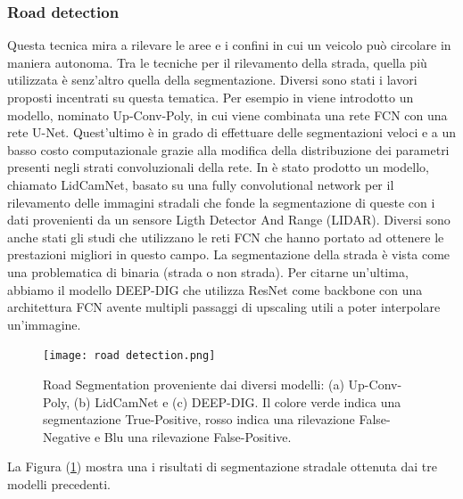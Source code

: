 \subsubsection{Road detection}
Questa tecnica mira a rilevare le aree e i confini in cui un veicolo può circolare 
in maniera autonoma. Tra le tecniche per il rilevamento 
della strada, quella più utilizzata è senz'altro quella della segmentazione. Diversi sono stati i 
lavori proposti incentrati su questa tematica. Per esempio in \cite{Up-conv-Poly} viene 
introdotto un modello, nominato Up-Conv-Poly, in cui viene combinata una 
rete FCN con una rete U-Net. Quest'ultimo è in grado di effettuare delle 
segmentazioni veloci e a un basso costo computazionale grazie alla modifica 
della distribuzione dei parametri presenti negli strati convoluzionali della 
rete. In \cite{CALTAGIRONE2019125} è stato prodotto un modello, chiamato LidCamNet, basato su 
una fully convolutional network per il rilevamento delle immagini stradali 
che fonde la segmentazione di queste con i dati provenienti da un sensore 
Ligth Detector And Range (LIDAR). Diversi sono anche stati gli studi che 
utilizzano le reti FCN che hanno portato ad ottenere le prestazioni migliori 
in questo campo. La segmentazione della strada è vista come una problematica di 
 binaria (strada o non strada). Per citarne un'ultima, abbiamo 
il modello DEEP-DIG \cite{DEEP-DIG} che utilizza ResNet come backbone con una 
architettura FCN avente multipli passaggi di upscaling utili a poter interpolare 
un'immagine. 
\begin{figure}
    \centering
    \texttt{[image: road detection.png]}
    \centering
    \caption{Road Segmentation proveniente dai diversi modelli: (a) Up-Conv-Poly, (b) LidCamNet e (c) DEEP-DIG. Il colore verde indica una segmentazione True-Positive, rosso indica una rilevazione False-Negative e Blu una rilevazione False-Positive.}
    \label{road-det}
\end{figure}
La Figura (\ref{road-det}) mostra una i risultati di segmentazione stradale ottenuta 
dai tre modelli precedenti.

